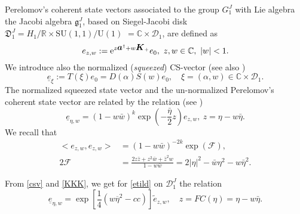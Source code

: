 \documentclass[12pt]{amsart}
\numberwithin{equation}{section}
\theoremstyle{definition}
\begin{document}
 Perelomov's coherent state   vectors   associated to the group $G^J_{1}$ with 
Lie algebra the Jacobi algebra ${{\mathfrak{{g}}}}^J_{1}$, based on Siegel-Jacobi
disk $ \mathfrak{D}^J_{1}  =  H_1/{\ensuremath{\mathbb{R}}}\times \text{SU}(1,1)/\text{U}(1)$
$ ={\ensuremath{\mathbb{C}}}\times{{\mathcal{{D}}}}_1$,  
are defined as 
\begin{equation}\label{csu}
e_{z,w}:={{\mbox{\rm e}}}^{z{{\mbox{\boldmath{${a}$}}}}^{\dagger}+w{{{\mbox{\boldmath{${K}$}}}}}_+}e_0, ~z,w\in{\ensuremath{\mathbb{C}}},~ |w|<1 .
\end{equation}
We introduce also the normalized    ({\it squeezed})     CS-vector
(see also \cite{stol}) 
\begin{equation}\label{sqz}
\underline{e}_{\xi}:= T(\xi)  e_0=D(\alpha )S(w) e_0, \quad \xi=(\alpha, w)\in{\ensuremath{\mathbb{C}}}\times{{\mathcal{{D}}}}_1.\end{equation}
The normalized squeezed state vector   and the
un-normalized 
 Perelomov's coherent state vector
are related by the relation (see \cite{jac1})
\begin{equation}\label{csv}
\underline{e}_{\eta, w} = (1-w\bar{w})^k
\exp (-\frac{\bar{\eta}}{2}z)e_{z,w},~ z=\eta-w\bar{\eta}.
\end{equation}
We recall \cite{jac1, nou}  that 
\begin{subequations}\label{KKK}
\begin{align}
<e_{z,w},e_{z,w}> & = (1-w\bar{w})^{-2k}\exp({{\mathcal{{F}}}}),\\
2{{\mathcal{{F}}}} &= \frac{2z{\bar{z}}+z^2\bar{w}+\bar{z}^2w}{1-w\bar{w}}
=2|\eta|^2-\bar{w}\eta^2-w\bar{\eta}^2.
\end{align}
\end{subequations}

From \eqref{csv} and \eqref{KKK}, we get for \eqref{etild} on
${{\mathcal{{D}}}}^J_1$ the relation
\begin{equation}\label{legPH}
\underline{e}_{\eta,w}=\exp[\frac{1}{4}(w\overline{\eta}^2-cc)]\tilde{e}_{z,w},\quad z=FC(\eta)=\eta-w\bar{\eta}.
\end{equation}
\end{document}
